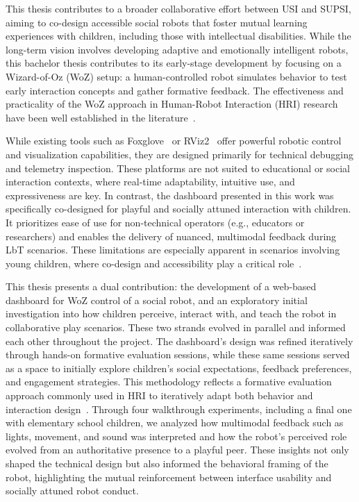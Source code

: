 \documentclass[a4paper]{usiinfbachelorproject}
\begin{document}
This thesis contributes to a broader collaborative effort between USI and SUPSI, aiming to co-design accessible social robots that foster mutual learning experiences with children, including those with intellectual disabilities.
While the long-term vision involves developing adaptive and emotionally intelligent robots, this bachelor thesis contributes to its early-stage development by focusing on a Wizard-of-Oz (WoZ) setup: a human-controlled robot simulates behavior to test early interaction concepts and gather formative feedback.
The effectiveness and practicality of the WoZ approach in Human-Robot Interaction (HRI) research have been well established in the literature~\cite{weiss2010userWOZ, rietz2021woz4uPepper, SCHOONDERWOERD2022102831}.

While existing tools such as Foxglove~\cite{foxglove} or RViz2~\cite{rviz2} offer powerful robotic control and visualization capabilities, they are designed primarily for technical debugging and telemetry inspection.
These platforms are not suited to educational or social interaction contexts, where real-time adaptability, intuitive use, and expressiveness are key.
In contrast, the dashboard presented in this work was specifically co-designed for playful and socially attuned interaction with children.
It prioritizes ease of use for non-technical operators (e.g., educators or researchers) and enables the delivery of nuanced, multimodal feedback during LbT scenarios.
These limitations are especially apparent in scenarios involving young children, where co-design and accessibility play a critical role~\cite{osti_10386132, rose2019participatory}.

This thesis presents a dual contribution: the development of a web-based dashboard for WoZ control of a social robot, and an exploratory initial investigation into how children perceive, interact with, and teach the robot in collaborative play scenarios.
These two strands evolved in parallel and informed each other throughout the project.
The dashboard's design was refined iteratively through hands-on formative evaluation sessions, while these same sessions served as a space to initially explore children's social expectations, feedback preferences, and engagement strategies.
This methodology reflects a formative evaluation approach commonly used in HRI to iteratively adapt both behavior and interaction design~\cite{love2024teachable}.
Through four walkthrough experiments, including a final one with elementary school children, we analyzed how multimodal feedback such as lights, movement, and sound was interpreted and how the robot's perceived role evolved from an authoritative presence to a playful peer.
These insights not only shaped the technical design but also informed the behavioral framing of the robot, highlighting the mutual reinforcement between interface usability and socially attuned robot conduct.
\end{document}
